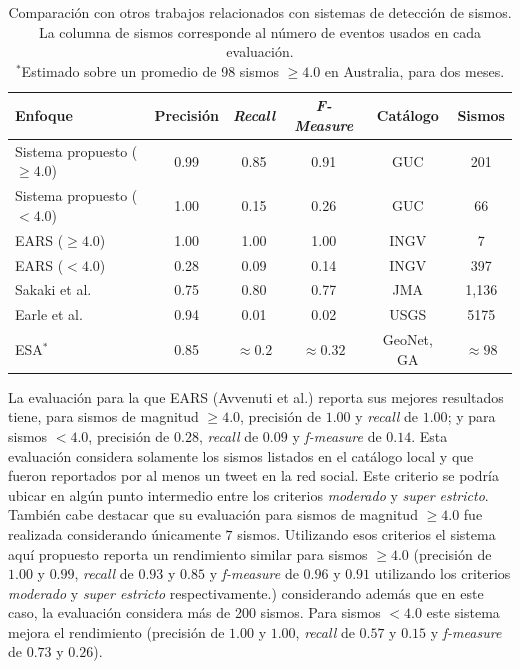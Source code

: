 \begin{table}[!ht]
\centering
  \begin{tabular}{lccccc}
    \toprule
    {Enfoque} & {Precisión} & {\em Recall} & {\em F-Measure} & {Catálogo} & {Sismos} \\
    \midrule
       	{Sistema propuesto ($\geq 4.0$)}  &  0.99 &  0.85 &  0.91 & {GUC} & 201 \\
    	{Sistema propuesto ($<4.0$)}  &  1.00 & 0.15 & 0.26 & {GUC} & 66 \\
    \midrule
    	{EARS ($\geq 4.0$)}	  &	1.00 & 1.00 & 1.00 & {INGV} & 7 \\
		{EARS ($<4.0$)}  &  0.28 & 0.09 & 0.14 & {INGV} & 397 \\
	\midrule
		{Sakaki et al.} &	0.75 & 0.80 & 0.77 & {JMA} & 1,136 \\
	\midrule
		{Earle et al.}  & 0.94 &  0.01   &  0.02   & {USGS} & 5175 \\
	\midrule
		{ESA}$^*$	& 0.85 & $\approx 0.2$ & $\approx 0.32$ & {GeoNet, GA} & $\approx98$ \\
	\bottomrule
   \end{tabular}
  \caption{Comparación con otros trabajos relacionados con sistemas de detección de sismos. La columna de sismos corresponde al número de eventos usados en cada evaluación.\\\small{$^*$Estimado sobre un promedio de 98 sismos $\geq 4.0$ en Australia, para dos meses.}}\label{table:other-methods}
\end{table}

La evaluación para la que EARS (Avvenuti et al.) reporta sus mejores resultados tiene, para sismos de magnitud $\geq 4.0$, precisión de $1.00$ y {\em recall} de $1.00$; y para sismos $<4.0$, precisión de $0.28$, {\em recall} de $0.09$ y {\em f-measure} de $0.14$. Esta evaluación considera solamente los sismos listados en el catálogo local y que fueron reportados por al menos un tweet en la red social. Este criterio se podría ubicar en algún punto intermedio entre los criterios {\em moderado} y {\em super estricto}. También cabe destacar que su evaluación para sismos de magnitud $\geq 4.0$ fue realizada considerando únicamente $7$ sismos.
% 
Utilizando esos criterios el sistema aquí propuesto reporta un rendimiento similar para sismos $\geq 4.0$ (precisión de $1.00$ y $0.99$, {\em recall} de $0.93$ y $0.85$ y {\em f-measure} de $0.96$ y $0.91$ utilizando los criterios {\em moderado} y {\em super estricto} respectivamente.) considerando además que en este caso, la evaluación considera más de 200 sismos. 
%
Para sismos $<4.0$ este sistema mejora el rendimiento (precisión de $1.00$ y $1.00$, {\em recall} de $0.57$ y $0.15$ y {\em f-measure} de $0.73$ y $0.26$).

